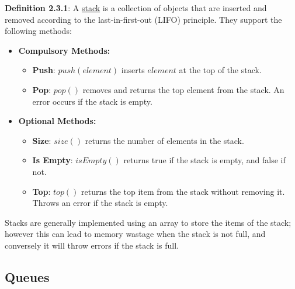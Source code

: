 \documentclass{article}
\newcommand{\definition}[2]{\textbf{Definition #1}: #2\label{def:#1}}
\begin{document}
\definition{2.3.1}{A \underline{stack} is a collection of objects that are inserted and removed according to the last-in-first-out (LIFO) principle.} They support the following methods:
\begin{itemize}
    \item \textbf{Compulsory Methods:}
    \begin{itemize}
        \item \textbf{Push}: \(push(element)\) inserts \(element\) at the top of the stack.
        \item \textbf{Pop}: \(pop()\) removes and returns the top element from the stack. An error occurs if the stack is empty.
    \end{itemize}
    \item \textbf{Optional Methods:}
    \begin{itemize}
        \item \textbf{Size}: \(size()\) returns the number of elements in the stack.
        \item \textbf{Is Empty}: \(isEmpty()\) returns true if the stack is empty, and false if not.
        \item \textbf{Top}: \(top()\) returns the top item from the stack without removing it. Throws an error if the stack is empty.
    \end{itemize}
\end{itemize}
Stacks are generally implemented using an array to store the items of the stack; however this can lead to memory wastage when the stack is not full, and conversely it will throw errors if the stack is full.

\newpage\subsection{Queues}
\end{document}
